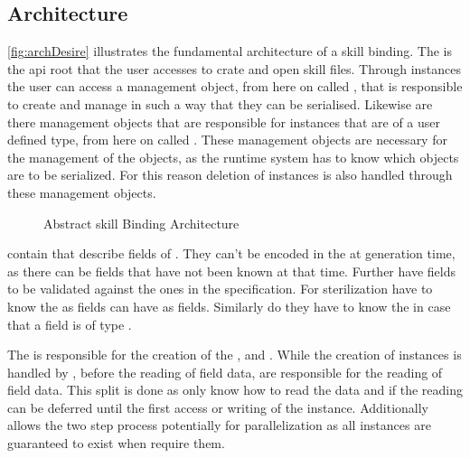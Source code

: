 \documentclass[thesis]{subfiles}
\begin{document}
  \subsection{Architecture}\label{sec:skillArch}
    \autoref{fig:archDesire} illustrates the fundamental architecture of a \gls{skill} binding.
    The \SkillFile is the \gls{api} root that the user accesses to crate and open \gls{skill} files.
    Through \SkillFile instances the user can access a management object, from here on called \StringPool, that is responsible to create and manage \Strings in such a way that they can be serialised.
    Likewise are there management objects that are responsible for instances that are of a user defined type, from here on called \UserTypePools.
    These management objects are necessary for the management of the objects, as the runtime system has to know which objects are to be serialized.
    For this reason deletion of instances is also handled through these management objects.
    \autocite[107--112]{skill-dis}

    \begin{figure}[ht]
      \centering
      
      \caption{Abstract \gls{skill} Binding Architecture}\label{fig:archDesire}
    \end{figure}

    \UserTypePools contain \FieldDeclarations that describe fields of \UserTypes.
    They can't be encoded in the \UserTypePools at generation time, as there can be fields that have not been known at that time.
    Further have fields to be validated against the ones in the specification.
    For sterilization \FieldDeclarations have to know the \UserTypePools as \UserType fields can have \UserTypes as fields.
    Similarly do they have to know the \StringPool in case that a field is of type \String.
    \autocite[144--148]{skill-dis}

    The \FileReader is responsible for the creation of the \StringPool, \UserTypePools and \FieldDeclarations.
    While the creation of \UserType instances is handled by \UserTypePools, before the reading of field data, \FieldDeclarations are responsible for the reading of field data.
    This split is done as only \FieldDeclarations know how to read the data and if the reading can be deferred until the first access or writing of the instance.
    Additionally allows the two step process potentially for parallelization as all \UserType instances are guaranteed to exist when \FieldDeclarations require them.
    \autocite[148f.]{skill-dis}
\end{document}
